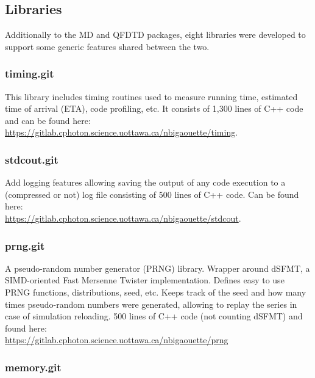 \subsection{Libraries}
\label{section:tools:libraries}

Additionally to the MD and QFDTD packages, eight libraries were developed to
support some generic features shared between the two.


\subsubsection{timing.git} \label{section:tools:libraries:timing}

This library includes timing routines used to measure running time, estimated
time of arrival (ETA), code profiling, etc. It consists of 1,300 lines of C++
code and can be found here:
\url{https://gitlab.cphoton.science.uottawa.ca/nbigaouette/timing}.


\subsubsection{stdcout.git} \label{section:tools:libraries:stdcout}

Add logging features allowing saving the output of any code execution to a
(compressed or not) log file consisting of 500 lines of C++ code.
Can be found here:\\
\url{https://gitlab.cphoton.science.uottawa.ca/nbigaouette/stdcout}.


\subsubsection{prng.git} \label{section:tools:libraries:prng}

A pseudo-random number generator (PRNG) library. Wrapper around
dSFMT\cite{prng2009}, a SIMD-oriented Fast Mersenne Twister implementation.
Defines easy to use PRNG functions, distributions, seed, etc. Keeps track of
the seed and how many times pseudo-random numbers were generated, allowing
to replay the series in case of simulation reloading. 500 lines of C++ code
(not counting dSFMT) and found here:\\
\url{https://gitlab.cphoton.science.uottawa.ca/nbigaouette/prng}


\subsubsection{memory.git} \label{section:tools:libraries:memory}

